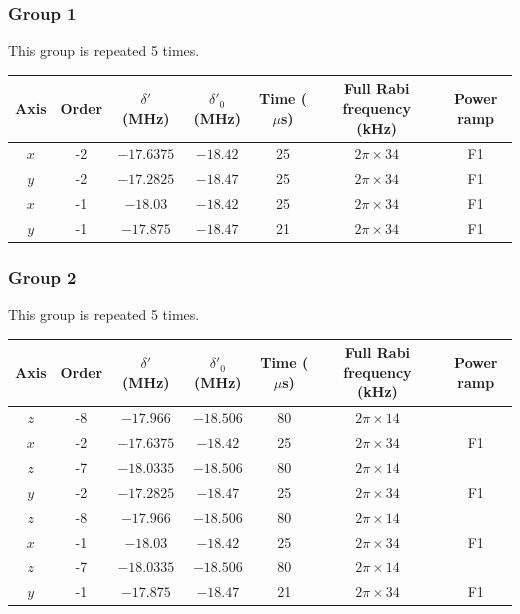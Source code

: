 \documentclass[aps,secnumarabic,amsmath,amssymb]{revtex4}
\begin{document}
\subsubsection{Group 1}
This group is repeated 5 times.
\begin{center}
  \begin{tabular}{|c|c|c|c|c|c|c|}
    \hline
    Axis&Order&$\delta'$ (MHz)&$\delta'_0$ (MHz)&Time ($\mu$s)&Full Rabi frequency (kHz)&Power ramp\\\hline
    $x$&-2&$-17.6375$&$-18.42$&25&$2\pi\times34$&F1\\\hline
    $y$&-2&$-17.2825$&$-18.47$&25&$2\pi\times34$&F1\\\hline
    $x$&-1&$-18.03$&$-18.42$&25&$2\pi\times34$&F1\\\hline
    $y$&-1&$-17.875$&$-18.47$&21&$2\pi\times34$&F1\\\hline
  \end{tabular}
\end{center}
\subsubsection{Group 2}
This group is repeated 5 times.
\begin{center}
  \begin{tabular}{|c|c|c|c|c|c|c|}
    \hline
    Axis&Order&$\delta'$ (MHz)&$\delta'_0$ (MHz)&Time ($\mu$s)&Full Rabi frequency (kHz)&Power ramp\\\hline
    $z$&-8&$-17.966$&$-18.506$&80&$2\pi\times14$&\\\hline
    $x$&-2&$-17.6375$&$-18.42$&25&$2\pi\times34$&F1\\\hline
    $z$&-7&$-18.0335$&$-18.506$&80&$2\pi\times14$&\\\hline
    $y$&-2&$-17.2825$&$-18.47$&25&$2\pi\times34$&F1\\\hline
    $z$&-8&$-17.966$&$-18.506$&80&$2\pi\times14$&\\\hline
    $x$&-1&$-18.03$&$-18.42$&25&$2\pi\times34$&F1\\\hline
    $z$&-7&$-18.0335$&$-18.506$&80&$2\pi\times14$&\\\hline
    $y$&-1&$-17.875$&$-18.47$&21&$2\pi\times34$&F1\\\hline
  \end{tabular}
\end{center}
\end{document}

